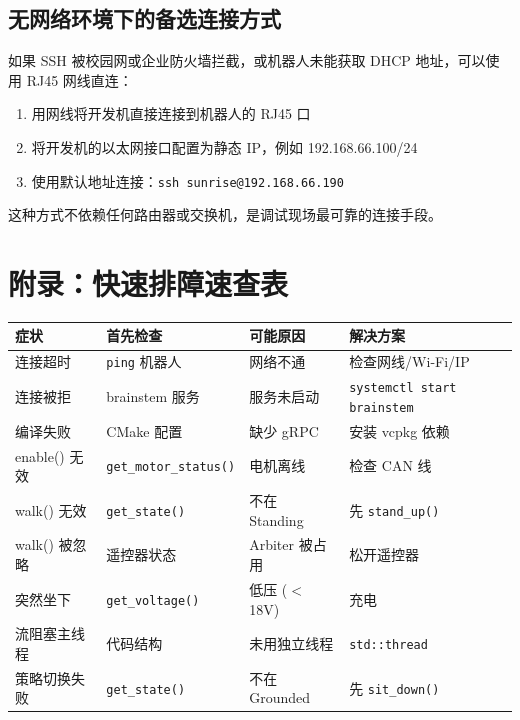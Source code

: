 \documentclass[a4paper,11pt,openany]{book}
\begin{document}
\subsection{无网络环境下的备选连接方式}

如果 SSH 被校园网或企业防火墙拦截，或机器人未能获取 DHCP 地址，可以使用 RJ45 网线直连：

\begin{enumerate}[nosep]
  \item 用网线将开发机直接连接到机器人的 RJ45 口
  \item 将开发机的以太网接口配置为静态 IP，例如 192.168.66.100/24
  \item 使用默认地址连接：\texttt{ssh sunrise@192.168.66.190}
\end{enumerate}

这种方式不依赖任何路由器或交换机，是调试现场最可靠的连接手段。

\section*{附录：快速排障速查表}

{\small
\begin{longtable}{llll}
\toprule
症状 & 首先检查 & 可能原因 & 解决方案 \\
\midrule
\endhead
连接超时 & \texttt{ping} 机器人 & 网络不通 & 检查网线/Wi-Fi/IP \\
连接被拒 & brainstem 服务 & 服务未启动 & \texttt{systemctl start brainstem} \\
编译失败 & CMake 配置 & 缺少 gRPC & 安装 vcpkg 依赖 \\
enable() 无效 & \texttt{get\_motor\_status()} & 电机离线 & 检查 CAN 线 \\
walk() 无效 & \texttt{get\_state()} & 不在 Standing & 先 \texttt{stand\_up()} \\
walk() 被忽略 & 遥控器状态 & Arbiter 被占用 & 松开遥控器 \\
突然坐下 & \texttt{get\_voltage()} & 低压 ($<$ 18V) & 充电 \\
流阻塞主线程 & 代码结构 & 未用独立线程 & \texttt{std::thread} \\
策略切换失败 & \texttt{get\_state()} & 不在 Grounded & 先 \texttt{sit\_down()} \\
\bottomrule
\end{longtable}
}

\end{document}
